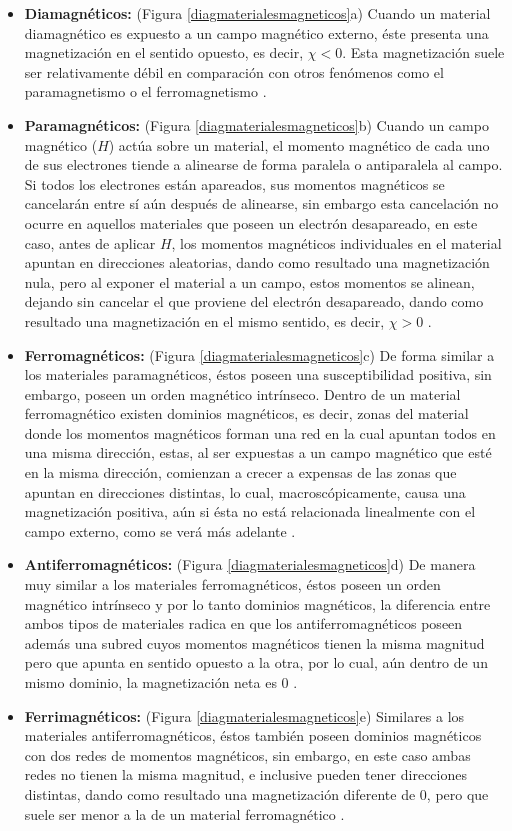 \documentclass[../main.tex]{subfiles}
\begin{document}
\begin{itemize}
\item \textbf{Diamagnéticos:} (Figura \ref{diagmaterialesmagneticos}a) Cuando un material diamagnético es expuesto a un campo magnético externo, éste presenta una magnetización en el sentido opuesto, es decir, $\chi<0$. Esta magnetización suele ser relativamente débil en comparación con otros fenómenos como el paramagnetismo o el ferromagnetismo \cite{griffiths2023introduction}.
\item \textbf{Paramagnéticos:} (Figura \ref{diagmaterialesmagneticos}b) Cuando un campo magnético ($H$) actúa sobre un material, el momento magnético de cada uno de sus electrones tiende a alinearse de forma paralela o antiparalela al campo. Si todos los electrones están apareados, sus momentos magnéticos se cancelarán entre sí aún después de alinearse, sin embargo esta cancelación no ocurre en aquellos materiales que poseen un electrón desapareado, en este caso, antes de aplicar $H$, los momentos magnéticos individuales en el material apuntan en direcciones aleatorias, dando como resultado una magnetización nula, pero al exponer el material a un campo, estos momentos se alinean, dejando sin cancelar el que proviene del electrón desapareado, dando como resultado una magnetización en el mismo sentido, es decir, $\chi>0$ \cite{griffiths2023introduction}.
\item \textbf{Ferromagnéticos:} (Figura \ref{diagmaterialesmagneticos}c) De forma similar a los materiales paramagnéticos, éstos poseen una susceptibilidad positiva, sin embargo, poseen un orden magnético intrínseco. Dentro de un material ferromagnético existen dominios magnéticos, es decir, zonas del material donde los momentos magnéticos forman una red en la cual apuntan todos en una misma dirección, estas, al ser expuestas a un campo magnético que esté en la misma dirección, comienzan a crecer a expensas de las zonas que apuntan en direcciones distintas, lo cual, macroscópicamente, causa una magnetización positiva, aún si ésta no está relacionada linealmente con el campo externo, como se verá más adelante \cite{coey2010magnetism}.
\item \textbf{Antiferromagnéticos:} (Figura \ref{diagmaterialesmagneticos}d) De manera muy similar a los materiales ferromagnéticos, éstos poseen un orden magnético intrínseco y por lo tanto dominios magnéticos, la diferencia entre ambos tipos de materiales radica en que los antiferromagnéticos poseen además una subred cuyos momentos magnéticos tienen la misma magnitud pero que apunta en sentido opuesto a la otra, por lo cual, aún dentro de un mismo dominio, la magnetización neta es 0 \cite{coey2010magnetism}.
\item \textbf{Ferrimagnéticos:} (Figura \ref{diagmaterialesmagneticos}e) Similares a los materiales antiferromagnéticos, éstos también poseen dominios magnéticos con dos redes de momentos magnéticos, sin embargo, en este caso ambas redes no tienen la misma magnitud, e inclusive pueden tener direcciones distintas, dando como resultado una magnetización diferente de 0, pero que suele ser menor a la de un material ferromagnético \cite{coey2010magnetism}.
\end{itemize}
\end{document}
